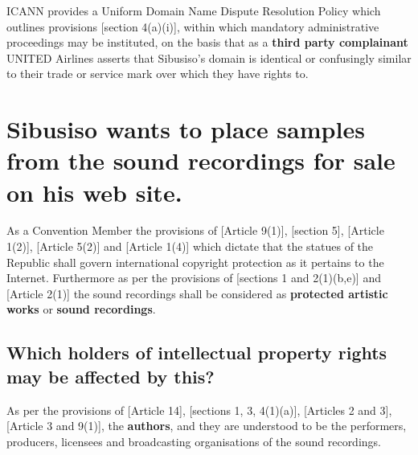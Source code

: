 \documentclass[11pt]{article}
\begin{document}
ICANN provides a Uniform Domain Name Dispute Resolution Policy which outlines
provisions [section 4(a)(i)]\cite{icann99_policy}, within which mandatory
administrative proceedings may be instituted, on the basis that as a \textbf{third
party complainant} UNITED Airlines asserts that Sibusiso's domain is identical
or confusingly similar to their trade or service mark over which they have
rights to.

\section{Sibusiso wants to place samples from the sound recordings for sale on his web site.}
\label{sec:orgfde6384}
As a Convention Member the provisions of [Article 9(1)]\cite{wto17_trips},
[section 5]\cite{rsa78_copyrightact}, [Article 1(2)]\cite{eurlex00_elec_commerce},
[Article 5(2)]\cite{wipo86_berne} and [Article 1(4)]\cite{wipo96_copyright_treaty}
which dictate that the statues of the Republic shall govern international
copyright protection as it pertains to the Internet. Furthermore as per the
provisions of [sections 1 and 2(1)(b,e)]\cite{rsa78_copyrightact} and [Article
2(1)]\cite{wipo86_berne} the sound recordings shall be considered as \textbf{protected
artistic works} or \textbf{sound recordings}.

\subsection{Which holders of intellectual property rights may be affected by this?}
\label{sec:org424b8dc}

As per the provisions of [Article 14]\cite{wto17_trips}, [sections 1, 3,
4(1)(a)]\cite{rsa78_copyrightact}, [Articles 2 and 3]\cite{wipo96_wppt}, [Article 3
and 9(1)]\cite{wipo86_berne}, the \textbf{authors}, and they are understood to be the
performers, producers, licensees and broadcasting organisations of the sound
recordings.
\end{document}
